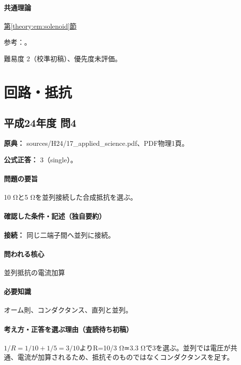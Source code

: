 \paragraph{共通理論} \hyperref[theory:em:solenoid]{第\ref*{theory:em:solenoid}節}

\par 参考：\cite{mit_em09}。

\par 難易度 2（校準初稿）、優先度未評価。

\section{回路・抵抗}

\subsection{平成24年度 問4}
\label{q:h24-reg-applied-04}

\noindent\textbf{原典：} sources/H24/17\_applied\_science.pdf、PDF物理1頁。

\textbf{公式正答：} 3（single）。

\paragraph{問題の要旨} 10 Ωと5 Ωを並列接続した合成抵抗を選ぶ。

\paragraph{確認した条件・記述（独自要約）}\mbox{}\par

\noindent\textbf{接続：} 同じ二端子間へ並列に接続。\par

\paragraph{問われる核心} 並列抵抗の電流加算

\paragraph{必要知識} オーム則、コンダクタンス、直列と並列。

\paragraph{考え方・正答を選ぶ理由（査読待ち初稿）} \(1/R=1/10+1/5=3/10\)よりR=\allowbreak{}10/3 Ω≃3.3 Ωで3を選ぶ。並列では電圧が共通、電流が加算されるため、抵抗そのものではなくコンダクタンスを足す。

